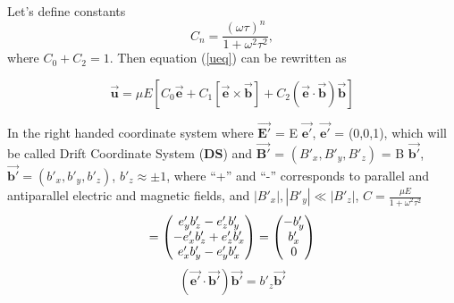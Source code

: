 \documentclass[12pt]{article} %
\begin{document}

Let's define constants 
\begin{equation}\label{C_consts}
C_{n} = \frac{(\omega \tau )^{n}}{1 + \omega^2\tau^2},
\end{equation}
where $C_{0} + C_{2} = 1$.
Then equation (\ref{ueq}) can be rewritten as

\begin{equation} \label{ueqC}
\overrightarrow{\mathbf{u}}=
\mu E 
\left[
 C_{0} \overrightarrow{\mathbf{e}} + 
 C_{1} \left[ \overrightarrow{\mathbf{e}} \times \overrightarrow{\mathbf{b}} \right] + 
 C_{2} \left( \overrightarrow{\mathbf{e}} \cdot  \overrightarrow{\mathbf{b}} \right) \overrightarrow{\mathbf{b}} 
\right]
\end{equation}

In the right handed coordinate system where 
$\overrightarrow{\mathbf{E'}}$ = E 
$\overrightarrow{\mathbf{e'}}$, 
$\overrightarrow{\mathbf{e'}}$ = (0,0,1), which will be called Drift Coordinate System ({\bf DS}) and  
$\overrightarrow{\mathbf{B'}}$ = 
$(B'_{x},B'_{y}, B'_{z})$ = B 
$\overrightarrow{\mathbf{b'}}$, 
$\overrightarrow{\mathbf{b'}} = (b'_{x}, b'_{y}, b'_{z})$, $b'_{z} \approx \pm 1$, where ``+'' and ``-'' corresponds to parallel and antiparallel electric and magnetic fields, and
$ \left| B'_{x} \right|,  \left| B'_{y} \right| \ll \left| B'_{z} \right|$, $C = \frac{\mu E}{1 + \omega^2\tau^2} $
\begin{equation*} 
 [ \overrightarrow{\mathbf{e'}} \times \overrightarrow{\mathbf{b'}}] = 
\begin{pmatrix} 
 e'_{y} b'_{z} - e'_{z} b'_{y} \cr 
-e'_{x} b'_{z} + e'_{z} b'_{x} \cr 
 e'_{x} b'_{y} - e'_{y} b'_{x} 
\end{pmatrix}
=
\begin{pmatrix} 
- b'_{y} \cr 
  b'_{x} \cr 
  0 
\end{pmatrix}
\end{equation*}
\begin{equation*} 
(\overrightarrow{\mathbf{e'}} \cdot  \overrightarrow{\mathbf{b'}}) \overrightarrow{\mathbf{b'}} 
= b'_{z} \overrightarrow{\mathbf{b'}}
\end{equation*}
\end{document}
